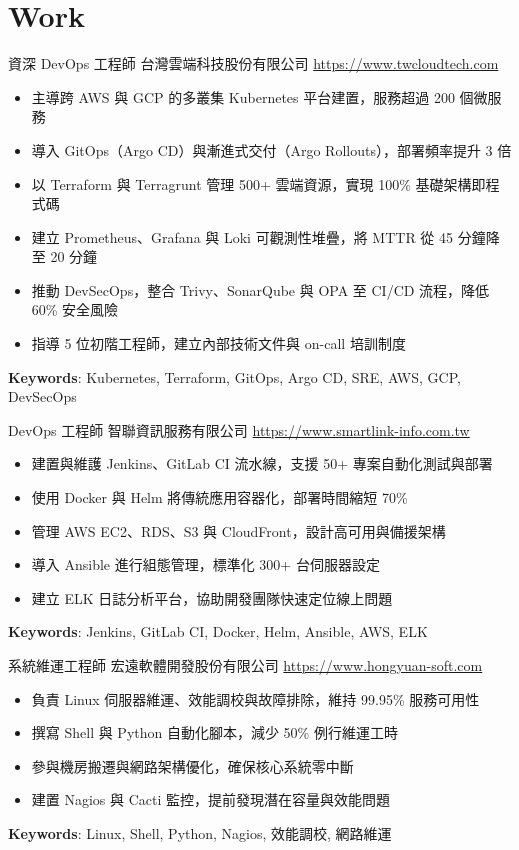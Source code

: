 \documentclass[a4paper, serif, 10pt]{moderncv}
\begin{document}
\section{Work}

        {資深 DevOps 工程師}
        {台灣雲端科技股份有限公司}
        {\url{https://www.twcloudtech.com}}
        {}
        {\begin{itemize}
\item 主導跨 AWS 與 GCP 的多叢集 Kubernetes 平台建置，服務超過 200 個微服務
\item 導入 GitOps（Argo CD）與漸進式交付（Argo Rollouts），部署頻率提升 3 倍
\item 以 Terraform 與 Terragrunt 管理 500+ 雲端資源，實現 100\% 基礎架構即程式碼
\item 建立 Prometheus、Grafana 與 Loki 可觀測性堆疊，將 MTTR 從 45 分鐘降至 20 分鐘
\item 推動 DevSecOps，整合 Trivy、SonarQube 與 OPA 至 CI/CD 流程，降低 60\% 安全風險
\item 指導 5 位初階工程師，建立內部技術文件與 on-call 培訓制度
\end{itemize}
\textbf{Keywords}: Kubernetes, Terraform, GitOps, Argo CD, SRE, AWS, GCP, DevSecOps}

        {DevOps 工程師}
        {智聯資訊服務有限公司}
        {\url{https://www.smartlink-info.com.tw}}
        {}
        {\begin{itemize}
\item 建置與維護 Jenkins、GitLab CI 流水線，支援 50+ 專案自動化測試與部署
\item 使用 Docker 與 Helm 將傳統應用容器化，部署時間縮短 70\%
\item 管理 AWS EC2、RDS、S3 與 CloudFront，設計高可用與備援架構
\item 導入 Ansible 進行組態管理，標準化 300+ 台伺服器設定
\item 建立 ELK 日誌分析平台，協助開發團隊快速定位線上問題
\end{itemize}
\textbf{Keywords}: Jenkins, GitLab CI, Docker, Helm, Ansible, AWS, ELK}

        {系統維運工程師}
        {宏遠軟體開發股份有限公司}
        {\url{https://www.hongyuan-soft.com}}
        {}
        {\begin{itemize}
\item 負責 Linux 伺服器維運、效能調校與故障排除，維持 99.95\% 服務可用性
\item 撰寫 Shell 與 Python 自動化腳本，減少 50\% 例行維運工時
\item 參與機房搬遷與網路架構優化，確保核心系統零中斷
\item 建置 Nagios 與 Cacti 監控，提前發現潛在容量與效能問題
\end{itemize}
\textbf{Keywords}: Linux, Shell, Python, Nagios, 效能調校, 網路維運}
\end{document}
